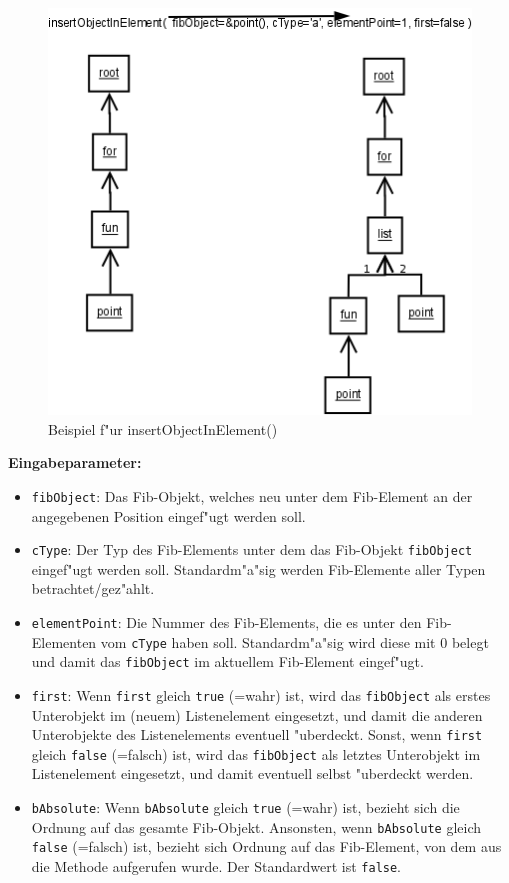\begin{figure}[htbp]
\begin{center}
  \includegraphics[scale=0.5]{insertObjectInElement}
\end{center}
\caption{Beispiel f"ur insertObjectInElement()}
\label{figInsertObjectInObject}
\end{figure}

\graphicspath{{./klassendiagramme/}}
\graphicspath{{./klassendiagramme/}{../klassendiagramme}}


\bigskip\noindent
\textbf{Eingabeparameter:}
\begin{itemize}
 \item \verb|fibObject|: Das Fib-Objekt, welches neu unter dem Fib-Element an der angegebenen Position eingef"ugt werden soll.
 \item \verb|cType|: Der Typ des Fib-Elements unter dem das Fib-Objekt \verb|fibObject| eingef"ugt werden soll. Standardm"a"sig werden Fib-Elemente aller Typen betrachtet/gez"ahlt.
 \item \verb|elementPoint|: Die Nummer des Fib-Elements, die es unter den Fib-Elementen vom \verb|cType| haben soll. Standardm"a"sig wird diese mit $0$ belegt und damit das \verb|fibObject| im aktuellem Fib-Element eingef"ugt.
 \item \verb|first|: Wenn \verb|first| gleich \verb|true| (=wahr) ist, wird das \verb|fibObject| als erstes Unterobjekt im (neuem) Listenelement eingesetzt, und damit die anderen Unterobjekte des Listenelements eventuell "uberdeckt. Sonst, wenn \verb|first| gleich \verb|false| (=falsch) ist, wird das \verb|fibObject| als letztes Unterobjekt im Listenelement eingesetzt, und damit eventuell selbst "uberdeckt werden.
 \item \verb|bAbsolute|: Wenn \verb|bAbsolute| gleich \verb|true| (=wahr) ist, bezieht sich die Ordnung auf das gesamte Fib-Objekt. Ansonsten, wenn \verb|bAbsolute| gleich \verb|false| (=falsch) ist, bezieht sich Ordnung auf das Fib-Element, von dem aus die Methode aufgerufen wurde. Der Standardwert ist \verb|false|.
\end{itemize}

